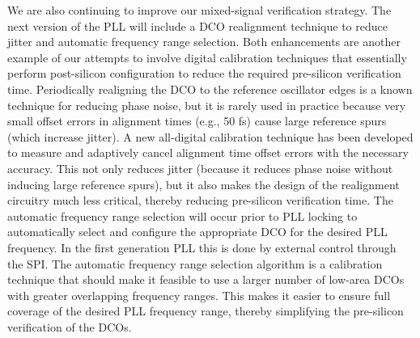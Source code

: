 We are also continuing to improve our mixed-signal verification strategy. The next version of the PLL will include a DCO realignment technique to reduce jitter and automatic frequency range selection. Both enhancements are another example of our attempts to involve digital calibration techniques that essentially perform post-silicon configuration to reduce the required pre-silicon verification time. Periodically realigning the DCO to the reference oscillator edges is a known technique for reducing phase noise, but it is rarely used in practice because very small offset errors in alignment times (e.g., 50 fs) cause large reference spurs (which increase jitter). A new all-digital calibration technique has been developed to measure and adaptively cancel alignment time offset errors with the necessary accuracy. This not only reduces jitter (because it reduces phase noise without inducing large reference spurs), but it also makes the design of the realignment circuitry much less critical, thereby reducing pre-silicon verification time. The automatic frequency range selection will occur prior to PLL locking to automatically select and configure the appropriate DCO for the desired PLL frequency. In the first generation PLL this is done by external control through the SPI. The automatic frequency range selection algorithm is a calibration technique that should make it feasible to use a larger number of low-area DCOs with greater overlapping frequency ranges. This makes it easier to ensure full coverage of the desired PLL frequency range, thereby simplifying the pre-silicon verification of the DCOs.